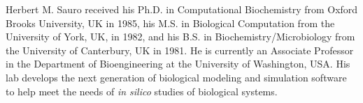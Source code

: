 \documentclass[journal,transmag,twoside]{IEEEtran}
\begin{document}
\begin{IEEEbiography}{Herbert M. Sauro}
received his Ph.D. in Computational Biochemistry from Oxford Brooks University, UK in 1985, his M.S. in Biological Computation from the University of York, UK, in 1982, and his B.S. in Biochemistry/Microbiology from the University of Canterbury, UK in 1981. He is currently an Associate Professor in the Department of Bioengineering at the University of Washington, USA. His lab develops the next generation of biological modeling and simulation software to help meet the needs of \textit{in silico} studies of biological systems.
\end{IEEEbiography}

\vfill
\end{document}
